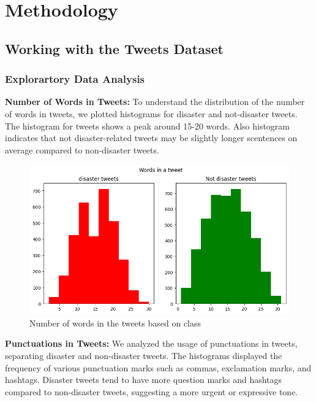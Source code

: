 \chapter{Methodology}
\label{ch:method} %


\section{Working with the Tweets Dataset}

\subsection{Explorartory Data Analysis}

\textbf{Number of Words in Tweets:}
To understand the distribution of the number of words in tweets, we plotted histograms for disaster and not-disaster tweets. The histogram for tweets shows a peak around 15-20 words. Also histogram indicates that not disaster-related tweets may be slightly longer scentences on average compared to non-disaster tweets.

\begin{figure}[ht]
    \centering
    \includegraphics[scale=0.7]{figures/numberofwords.png}
    \caption{Number of words in the tweets based on class}
\end{figure}

\newpage
\textbf{Punctuations in Tweets:}
We analyzed the usage of punctuations in tweets, separating disaster and non-disaster tweets. The histograms displayed the frequency of various punctuation marks such as commas, exclamation marks, and hashtags. Disaster tweets tend to have more question marks and hashtags compared to non-disaster tweets, suggesting a more urgent or expressive tone.


